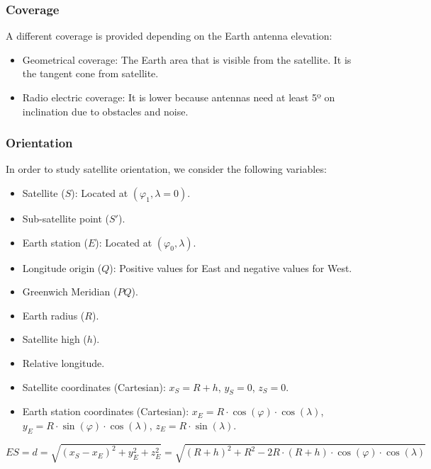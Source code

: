 \documentclass[../main.tex]{subfiles}
\begin{document}
\subsubsection{Coverage}

A different coverage is provided depending on the Earth antenna elevation:
\begin{itemize}
	\item Geometrical coverage: The Earth area that is visible from the satellite. It is the tangent cone from satellite.
	\item Radio electric coverage: It is lower because antennas need at least 5º on inclination due to obstacles and noise.
\end{itemize}

\subsubsection{Orientation}

In order to study satellite orientation, we consider the following variables:
\begin{itemize}
	\item Satellite ($S$): Located at $(\varphi_1, \lambda = 0)$.
	\item Sub-satellite point ($S'$).
	\item Earth station ($E$): Located at $(\varphi_0, \lambda)$.
	\item Longitude origin ($Q$): Positive values for East and negative values for West.
	\item Greenwich Meridian ($PQ$).
	\item Earth radius ($R$).
	\item Satellite high ($h$).
	\item Relative longitude.
	\item Satellite coordinates (Cartesian): $x_S = R + h$, $y_S = 0$, $z_S = 0$.
	\item Earth station coordinates (Cartesian): $x_E = R \cdot \cos(\varphi) \cdot \cos(\lambda)$, $y_E = R \cdot \sin(\varphi) \cdot \cos(\lambda)$, $z_E = R \cdot \sin(\lambda)$.
\end{itemize}

$$
	ES = d =
	\sqrt{ (x_S - x_E )^2 + y_{E}^2 + z_{E}^2 } =
	\sqrt{ ( R + h )^2 + R^2 - 2 R \cdot (R+h) \cdot \cos(\varphi) \cdot \cos(\lambda) }
$$
\end{document}
